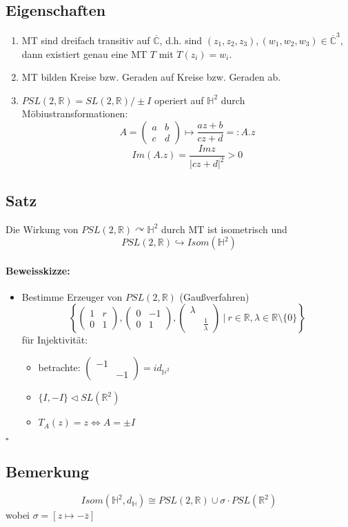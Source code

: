 \documentclass{article}
\newcommand{\R}{\mathbb{R}}
\newcommand{\C}{\mathbb{C}}
\renewcommand{\H}{\mathbb{H}}
\newcommand{\set}[2]{\left\lbrace #1~|~#2 \right\rbrace}
\newcommand{\qed}{\hfill $\square$}
\newcommand{\Matrix}[4]{\left(\begin{matrix}
		#1 & #2\\
		#3 & #4
	\end{matrix}\right)}
\begin{document}
\subsection{Eigenschaften}
\begin{enumerate}
	\item MT sind dreifach transitiv auf $\overline{\C}$, d.h. sind $(z_1, z_2, z_3),(w_1, w_2, w_3) \in \overline{\C}^3$, dann existiert genau eine MT $T$ mit $T(z_i) = w_i$.
	\item MT bilden Kreise bzw. Geraden auf Kreise bzw. Geraden ab.
	\item $PSL(2,\R) = SL(2,\R)/\pm I $ operiert auf $\H^2$ durch Möbiustransformationen:
	\[A = \left(\begin{matrix}
	a & b \\
	c & d
	\end{matrix}\right) \longmapsto \frac{az + b }{cz + d}=: A.z\]
	\[Im(A.z) = \frac{Im z}{\left|cz + d\right|^2} > 0 \]
\end{enumerate}

\subsection{Satz}
Die Wirkung von $PSL(2,\R) \curvearrowright \H^2$ durch MT ist isometrisch und 
\[PSL(2,\R) \hookrightarrow Isom(\H^2) \]

\paragraph{Beweisskizze:}
\begin{itemize}
	\item Bestimme Erzeuger von $PSL(2, \R)$ (Gaußverfahren)
	\[\set{\Matrix{1}{r}{0}{1}, \Matrix{0}{-1}{0}{1}, \Matrix{\lambda}{}{}{\frac{1}{\lambda}}}{r \in \R, \lambda \in \R \setminus \{0\}}\]
	für Injektivität:\\
	\begin{itemize}
		\item betrachte: $\Matrix{-1}{}{}{-1} = id_{\H^2}$
		\item $\{I, -I\} \triangleleft SL(\R^2)$
		\item $T_A(z) = z \Longleftrightarrow A = \pm I$
	\end{itemize}	
\end{itemize}
\qed

\subsection{Bemerkung}
\[Isom(\H^2, d_\H) \cong PSL(2,\R) \cup \sigma \cdot PSL(\R^2) \]
wobei $\sigma = [z \mapsto -\overline{z}]$
\end{document}
